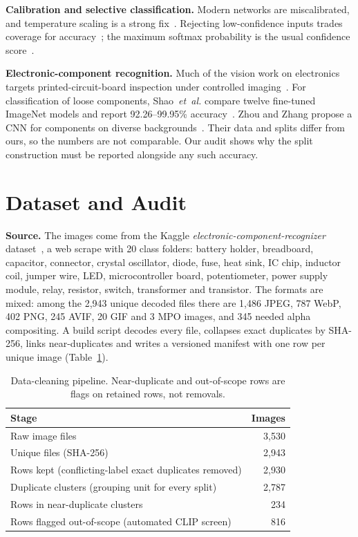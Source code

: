 \documentclass[conference]{IEEEtran}
\begin{document}
\textbf{Calibration and selective classification.} Modern networks are miscalibrated, and temperature scaling is a
strong fix~\cite{guo2017calibration}. Rejecting low-confidence inputs trades coverage for
accuracy~\cite{chow1970reject,geifman2017selective}; the maximum softmax probability is the usual confidence
score~\cite{hendrycks2017baseline}.

\textbf{Electronic-component recognition.} Much of the vision work on electronics targets
printed-circuit-board inspection under controlled imaging~\cite{ling2023pcb}. For classification of loose components, Shao~\emph{et~al.} compare twelve
fine-tuned ImageNet models and report 92.26--99.95\% accuracy~\cite{shao2025electronic}. Zhou and Zhang propose a CNN
for components on diverse backgrounds~\cite{zhou2025electronic}. Their data and splits differ from ours, so the
numbers are not comparable. Our audit shows why the split construction must be reported alongside any such
accuracy.

\section{Dataset and Audit}\label{sec:data}
\textbf{Source.} The images come from the Kaggle \emph{electronic-component-recognizer}
dataset~\cite{kaggle_dataset}, a web scrape with 20 class folders: battery holder, breadboard, capacitor, connector,
crystal oscillator, diode, fuse, heat sink, IC chip, inductor coil, jumper wire, LED, microcontroller board,
potentiometer, power supply module, relay, resistor, switch, transformer and transistor. The formats are mixed: among
the 2,943 unique decoded files there are 1,486 JPEG, 787 WebP, 402 PNG, 245 AVIF, 20 GIF and 3 MPO images, and 345
needed alpha compositing. A build script decodes every file, collapses exact duplicates by SHA-256, links
near-duplicates and writes a versioned manifest with one row per unique image (Table~\ref{tab:audit}).

\begin{table}[t]
\centering\footnotesize
\caption{Data-cleaning pipeline. Near-duplicate and out-of-scope rows are flags on retained rows, not removals.}
\label{tab:audit}
\begin{tabular}{@{}lr@{}}
\toprule
Stage & Images \\
\midrule
Raw image files & 3,530 \\
Unique files (SHA-256) & 2,943 \\
Rows kept (conflicting-label exact duplicates removed) & 2,930 \\
Duplicate clusters (grouping unit for every split) & 2,787 \\
Rows in near-duplicate clusters & 234 \\
Rows flagged out-of-scope (automated CLIP screen) & 816 \\
\bottomrule
\end{tabular}
\end{table}
\end{document}
